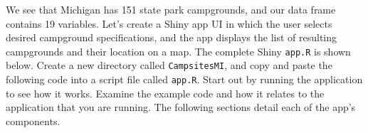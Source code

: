 \documentclass[
]{krantz}
\newenvironment{Shaded}{\begin{snugshade}}{\end{snugshade}}
\newcommand{\CommentTok}[1]{\textcolor[rgb]{0.56,0.35,0.01}{\textit{#1}}}
\newcommand{\DataTypeTok}[1]{\textcolor[rgb]{0.13,0.29,0.53}{#1}}
\newcommand{\DecValTok}[1]{\textcolor[rgb]{0.00,0.00,0.81}{#1}}
\newcommand{\KeywordTok}[1]{\textcolor[rgb]{0.13,0.29,0.53}{\textbf{#1}}}
\newcommand{\NormalTok}[1]{#1}
\newcommand{\OperatorTok}[1]{\textcolor[rgb]{0.81,0.36,0.00}{\textbf{#1}}}
\newcommand{\OtherTok}[1]{\textcolor[rgb]{0.56,0.35,0.01}{#1}}
\newcommand{\StringTok}[1]{\textcolor[rgb]{0.31,0.60,0.02}{#1}}
\begin{document}
We see that Michigan has 151 state park campgrounds, and our data frame contains 19 variables. Let's create a Shiny app UI in which the user selects desired campground specifications, and the app displays the list of resulting campgrounds and their location on a map. The complete Shiny \texttt{app.R} is shown below. Create a new directory called \texttt{CampsitesMI}, and copy and paste the following code into a script file called \texttt{app.R}. Start out by running the application to see how it works. Examine the example code and how it relates to the application that you are running. The following sections detail each of the app's components.

\begin{Shaded}
\end{Shaded}
\end{document}
